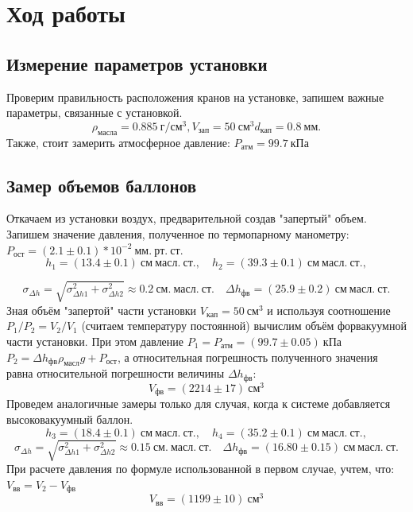 \documentclass[a4paper, 12pt]{article}%
\begin{document}
\section{Ход работы}
\subsection{Измерение параметров установки}
Проверим правильность расположения кранов на установке, запишем важные параметры, связанные с установкой.\\
\begin{equation*}
	\rho_{масла} = 0.885 ~г/см^{3}, V_{зап} = 50 ~см^{3}  d_{кап} = 0.8~мм.
\end{equation*}
Также, стоит замерить атмосферное давление: $P_{атм}=99.7~кПа$
\subsection{Замер объемов баллонов}
Откачаем из установки воздух, предварительной создав "запертый" объем. Запишем значение давления, полученное по термопарному манометру: $P_{ост} = (2.1 \pm 0.1)*10^{-2}~мм. ~рт.~ст.$\\
\begin{equation*}
		h_1 = (13.4 \pm 0.1)~см~масл. ~ст.,\quad  h_2 = (39.3 \pm 0.1)~ см ~масл. ~ст.,
\end{equation*}

\begin{equation*}
	\sigma_{\Delta h} = \sqrt{\sigma_{\Delta h1}^2 + \sigma_{\Delta h2}^2}\approx 0.2~ см. ~масл. ~ст. \quad \Delta h_{фв} = (25.9 \pm 0.2) ~ см ~масл. ~ст.
\end{equation*}
Зная объём "запертой"  части установки $V_{кап} = 50 ~ см^3$  и используя соотношение $P_1/P_2=V_2/V_1$ (считаем температуру постоянной) вычислим объём форвакуумной части установки. При этом давление $P_1 = P_{атм} = (99.7 \pm 0.05) ~ кПа$ $P_2 = \Delta h_{фв}  \rho_{масл} g + P_{ост}$, а относительная погрешность полученного значения равна относительной погрешности величины $\Delta h_{фв} $:
\begin{equation*}
	V_{фв} = (2214\pm 17) ~см^{3}
\end{equation*}
Проведем аналогичные замеры только для случая, когда к системе добавляется высоковакуумный баллон.
\begin{equation*}
	h_3 = (18.4 \pm 0.1)~см~масл. ~ст.,\quad  h_4 = (35.2 \pm 0.1)~ см ~масл. ~ст.,
\end{equation*}
\begin{equation*}
	\sigma_{\Delta h} = \sqrt{\sigma_{\Delta h1}^2 + \sigma_{\Delta h2}^2}\approx 0.15~ см. ~масл. ~ст. \quad \Delta h_{фв} = (16.80 \pm 0.15) ~ см ~масл. ~ст.
\end{equation*}
При расчете давления по формуле использованной в первом случае, учтем, что: $V_{вв} = V_{2} - V_{фв}$
\begin{equation*}
	V_{вв} = (1199\pm 10) ~см^{3}
\end{equation*}
\end{document}
